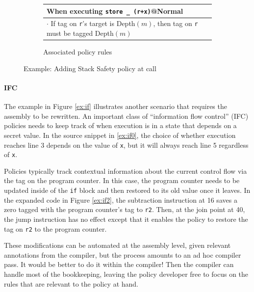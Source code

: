 \documentclass{report}
\begin{document}
\begin{figure}
\begin{subfigure}{\textwidth}
    \begin{tabular}{|l|}
      \hline
      When executing {\tt store \_ (r+x)}@{\sc Normal} \\
      \hline
      \rowcolor{blue!30}
      \(\cdot\) If tag on {\tt r}'s target is {\sc Depth}\((m)\), then
      tag on {\tt r} must be tagged {\sc Depth}\((m)\) \\
      \hline
    \end{tabular}
    \caption{Associated policy rules}
    \label{ex:call3}
  \end{subfigure}

  \caption{Example: Adding Stack Safety policy at call}
  \label{ex:call}
\end{figure}

\paragraph{IFC}

The example in Figure \ref{ex:if} illustrates another scenario that requires the assembly to be
rewritten. An important class of ``information flow control'' (IFC) policies needs to keep track
of when execution is in a state that depends on a secret value. In the source snippet in \ref{ex:if0},
the choice of whether execution reaches line 3 depends on the value of {\tt x},
but it will always reach line 5 regardless of {\tt x}.

Policies typically track contextual information about the current control flow via the tag on
the program counter. In this case, the program counter needs to be updated inside of the {\tt if}
block and then restored to its old value once it leaves. In the expanded code in Figure \ref{ex:if2},
the subtraction instruction at 16 saves a zero tagged with the program counter's tag to {\tt r2}.
Then, at the join point at 40, the jump instruction has no effect except that it enables the policy
to restore the tag on {\tt r2} to the program counter.

These modifications can be automated at the assembly level, given relevant annotations from
the compiler, but the process amounts to an ad hoc compiler pass. It would be better to do it within
the compiler! Then the compiler can handle most of the bookkeeping, leaving the policy developer free
to focus on the rules that are relevant to the policy at hand.
\end{document}
